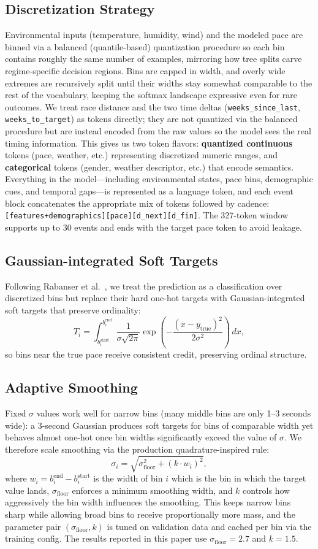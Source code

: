 \documentclass{article}
\begin{document}
\subsection{Discretization Strategy}
Environmental inputs (temperature, humidity, wind) and the modeled pace are binned via a balanced (quantile-based) quantization procedure so each bin contains roughly the same number of examples, mirroring how tree splits carve regime-specific decision regions. Bins are capped in width, and overly wide extremes are recursively split until their widths stay somewhat comparable to the rest of the vocabulary, keeping the softmax landscape expressive even for rare outcomes. We treat race distance and the two time deltas (\texttt{weeks\_since\_last}, \texttt{weeks\_to\_target}) as tokens directly; they are not quantized via the balanced procedure but are instead encoded from the raw values so the model sees the real timing information. This gives us two token flavors: \textbf{quantized continuous} tokens (pace, weather, etc.) representing discretized numeric ranges, and \textbf{categorical} tokens (gender, weather descriptor, etc.) that encode semantics. Everything in the model—including environmental states, pace bins, demographic cues, and temporal gaps—is represented as a language token, and each event block concatenates the appropriate mix of tokens followed by cadence: \texttt{[features+demographics][pace][d\_next][d\_fin]}. The 327-token window supports up to 30 events and ends with the target pace token to avoid leakage.
\subsection{Gaussian-integrated Soft Targets}
Following Rabanser et al.~\cite{rabanser2020discretization}, we treat the prediction as a classification over discretized bins but replace their hard one-hot targets with Gaussian-integrated soft targets that preserve ordinality:
\[
T_i = \int_{b_i^{\text{start}}}^{b_i^{\text{end}}}
\frac{1}{\sigma\sqrt{2\pi}}\exp\left(-\frac{(x - y_{\text{true}})^2}{2\sigma^2}\right)\,dx,
\]
so bins near the true pace receive consistent credit, preserving ordinal structure.
\subsection{Adaptive Smoothing}
Fixed \(\sigma\) values work well for narrow bins (many middle bins are only 1–3 seconds wide): a 3-second Gaussian produces soft targets for bins of comparable width yet behaves almost one-hot once bin widths significantly exceed the value of \(\sigma\). We therefore scale smoothing via the production quadrature-inspired rule:
\[
\sigma_i = \sqrt{ \sigma_{\text{floor}}^2 + (k \cdot w_i)^2 },
\]
where \(w_i = b_i^{\text{end}} - b_i^{\text{start}}\) is the width of bin \(i\) which is the bin in which the target value lands, \(\sigma_{\text{floor}}\) enforces a minimum smoothing width, and \(k\) controls how aggressively the bin width influences the smoothing. This keeps narrow bins sharp while allowing broad bins to receive proportionally more mass, and the parameter pair \((\sigma_{\text{floor}}, k)\) is tuned on validation data and cached per bin via the training config. The results reported in this paper use \(\sigma_{\text{floor}} = 2.7\) and \(k = 1.5\).
\end{document}

